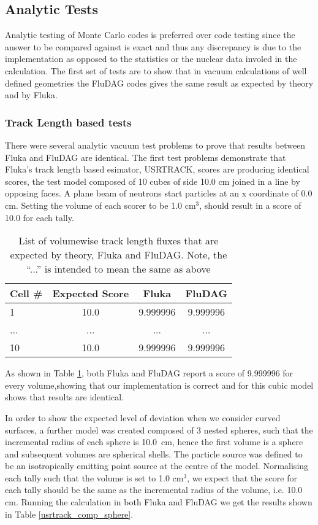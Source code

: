 \documentclass{anstrans}[11pt]
\begin{document}
\subsection{Analytic Tests}
Analytic testing of Monte Carlo codes is preferred over code testing since the
answer to be compared against is exact and thus any discrepancy is due
to the implementation as opposed to the statistics or the nuclear data
involed in the calculation. The first set of tests are to show that in
vacuum calculations of well defined geometries the FluDAG codes gives
the same result as expected by theory and by Fluka.

\subsubsection*{Track Length based tests}
There were several analytic vacuum test problems to prove that results
between Fluka and FluDAG are identical. The first test problems
demonstrate that Fluka's track length based esimator, USRTRACK, 
scores are producing identical scores, the test model composed of 
10 cubes of side 10.0 cm joined in a line by opposing faces. A plane 
beam of neutrons start particles at an x coordinate of 0.0 cm. Setting 
the volume of each scorer to be 1.0 cm$^3$, should result in a score of 
10.0 for each tally.

\begin{table}[h!]
	\begin{center}
		\begin{tabular}{|l|c|c|c|}
			\hline
			Cell \# & Expected Score & Fluka  & FluDAG \\
			\hline
			1 & 10.0 & 9.999996 & 9.999996 \\
			... & ... & ... & ... \\
			10 & 10.0 & 9.999996 & 9.999996 \\
			\hline
		\end{tabular}
	\caption{List of volumewise track length fluxes that are 
				expected by theory, Fluka and FluDAG. Note, the ``...''
				is intended to mean the same as above}
	\end{center}
	\label{usrtrack}
\end{table}

As shown in Table \ref{usrtrack}, both Fluka and FluDAG report a score of 
9.999996 for every volume,showing that our implementation is correct and for 
this cubic model shows that results are identical.

In order to show the expected level of deviation when we consider
curved surfaces, a further model was created composed of 3 nested
spheres, such that the incremental radius of each sphere is 10.0\ cm,
hence the first volume is a sphere and subsequent volumes are
spherical shells. The particle source was defined to be an
isotropically emitting point source at the centre of the
model. Normalising each tally such that the volume is set to 1.0 cm$^3$, 
we expect that the score for each tally should be the same as the
incremental radius of the volume, i.e. 10.0 cm. Running the calculation
in both Fluka and FluDAG we get the results shown in Table \ref{usrtrack_comp_sphere}.
\end{document}
